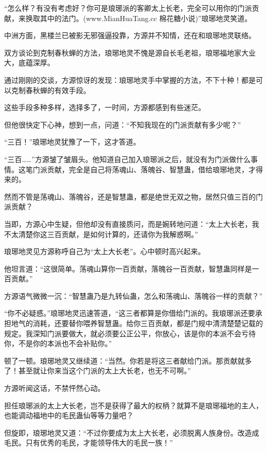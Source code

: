 
\begin{this_body}

“怎么样？有没有考虑好？你可是琅琊派的客卿太上长老，完全可以用你的门派贡献，来换取其中的法门。(www.MianHuaTang.cc 棉花糖小说)”琅琊地灵笑道。

中洲方面，黑楼兰已被影无邪强逼投靠，方源并不知情，还在和琅琊地灵联络。

双方谈论到克制春秋蝉的方法，琅琊地灵不愧是源自长毛老祖，琅琊福地家大业大，底蕴深厚。

通过刚刚的交谈，方源惊讶的发现：琅琊地灵手中掌握的方法，不下十种！都是可以克制春秋蝉的有效手段。

这些手段多种多样，选择多了，一时间，方源都感到有些迷茫。

但他很快定下心神，想到一点，问道：“不知我现在的门派贡献有多少呢？”

“三百！”琅琊地灵犹豫了一下，这才答道。

“三百……”方源皱了皱眉头。他知道自己加入琅琊派之后，就没有为门派做什么事情。这笔门派贡献，完全是自己将荡魂山、落魄谷、智慧蛊，借给琅琊地灵，才得来的。

然而不管是荡魂山、落魄谷，还是智慧蛊，都是绝世无双之物，居然只值三百的门派贡献？

当即，方源心中生疑，但他却没有直接质问，而是婉转地问道：“太上大长老，我不太清楚你这三百贡献，是如何计算的，还请你为我解惑啊。”

琅琊地灵见方源称呼自己为“太上大长老”。心中顿时高兴起来。

他坦言道：“这很简单。荡魂山算你一百贡献，落魄谷一百贡献，智慧蛊同样是一百贡献。”

方源语气微微一沉：“智慧蛊乃是九转仙蛊，怎么和荡魂山、落魄谷一样的贡献？”

“你不必疑惑。”琅琊地灵迅速答道，“这三者都算是你借给门派的。我琅琊派还要承担地气的消耗，还要替你喂养智慧蛊。给你三百贡献，都是门规中清清楚楚记载的规定。我深知门派要做大，就必须要公正公平，你放心，该是你的本派不会亏待你，不是你的本派也不会补贴你。”

顿了一顿。琅琊地灵又继续道：“当然。你若是将这三者献给门派。那贡献就多了！甚至就让你来当这个门派的太上大长老，也无不可啊。”

方源听闻这话，不禁怦然心动。

担任琅琊派的太上大长老，岂不是获得了最大的权柄？就算不是琅琊福地的主人，也能调动福地中的毛民蛊仙等等力量吧？

但旋即，琅琊地灵又道：“不过你要成为太上大长老，必须脱离人族身份。改造成毛民。只有优秀的毛民，才能领导伟大的毛民一族！”


\end{this_body}
